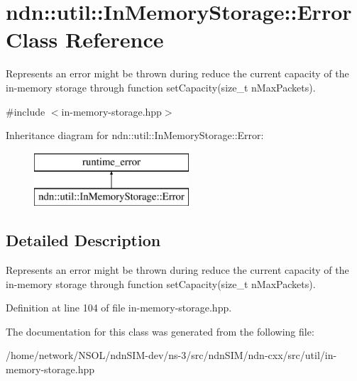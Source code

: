 \hypertarget{classndn_1_1util_1_1InMemoryStorage_1_1Error}{}\section{ndn\+:\+:util\+:\+:In\+Memory\+Storage\+:\+:Error Class Reference}
\label{classndn_1_1util_1_1InMemoryStorage_1_1Error}


Represents an error might be thrown during reduce the current capacity of the in-\/memory storage through function set\+Capacity(size\+\_\+t n\+Max\+Packets).  




{\ttfamily \#include $<$in-\/memory-\/storage.\+hpp$>$}

Inheritance diagram for ndn\+:\+:util\+:\+:In\+Memory\+Storage\+:\+:Error\+:\begin{figure}[H]
\begin{center}
\leavevmode
\includegraphics[height=2.000000cm]{classndn_1_1util_1_1InMemoryStorage_1_1Error}
\end{center}
\end{figure}


\subsection{Detailed Description}
Represents an error might be thrown during reduce the current capacity of the in-\/memory storage through function set\+Capacity(size\+\_\+t n\+Max\+Packets). 

Definition at line 104 of file in-\/memory-\/storage.\+hpp.



The documentation for this class was generated from the following file\+:\begin{DoxyCompactItemize}
\item 
/home/network/\+N\+S\+O\+L/ndn\+S\+I\+M-\/dev/ns-\/3/src/ndn\+S\+I\+M/ndn-\/cxx/src/util/in-\/memory-\/storage.\+hpp\end{DoxyCompactItemize}
